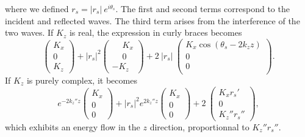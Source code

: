 where we defined $r_s = |r_s|\ e^{i\theta_{s}}$.
The first and second terms correspond to the incident and reflected waves.
The third term arises from the interference of the two waves.
If $K_z$ is real, the expression in curly braces becomes
$$
\begin{pmatrix}
K_x \\
0 \\
K_z
\end{pmatrix}
+ 
|r_s|^2
\begin{pmatrix}
\phantom{-} K_x \\
\phantom{-} 0 \\
- K_z
\end{pmatrix}
+ 2\ |r_s|\ 
\begin{pmatrix}
K_x \cos(\theta_{s} - 2 k_z z)\\
0 \\
0 \\
\end{pmatrix}.
$$
If $K_z$ is purely complex, it becomes
$$
e^{-2 k_z'' z} 
\begin{pmatrix}
K_x \\
0 \\
0
\end{pmatrix}
+ 
|r_s|^2
e^{2 k_z'' z}
\begin{pmatrix}
K_x \\
0 \\
0
\end{pmatrix}
+ 2\ 
\begin{pmatrix}
K_x r_s'\\
0 \\
K_z'' r_s''
\end{pmatrix},
$$
which exhibits an energy flow in the $z$ direction, proportionnal to $K_z'' r_s''$.

